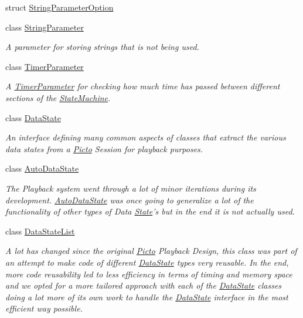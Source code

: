 \begin{DoxyCompactItemize}
struct \hyperlink{struct_picto_1_1_string_parameter_option}{String\-Parameter\-Option}
\item 
class \hyperlink{class_picto_1_1_string_parameter}{String\-Parameter}
\begin{DoxyCompactList}\small\item\em A parameter for storing strings that is not being used. \end{DoxyCompactList}\item 
class \hyperlink{class_picto_1_1_timer_parameter}{Timer\-Parameter}
\begin{DoxyCompactList}\small\item\em A \hyperlink{class_picto_1_1_timer_parameter}{Timer\-Parameter} for checking how much time has passed between different sections of the \hyperlink{class_picto_1_1_state_machine}{State\-Machine}. \end{DoxyCompactList}\item 
class \hyperlink{class_picto_1_1_data_state}{Data\-State}
\begin{DoxyCompactList}\small\item\em An interface defining many common aspects of classes that extract the various data states from a \hyperlink{namespace_picto}{Picto} Session for playback purposes. \end{DoxyCompactList}\item 
class \hyperlink{class_picto_1_1_auto_data_state}{Auto\-Data\-State}
\begin{DoxyCompactList}\small\item\em The Playback system went through a lot of minor iterations during its development. \hyperlink{class_picto_1_1_auto_data_state}{Auto\-Data\-State} was once going to generalize a lot of the functionality of other types of Data \hyperlink{class_picto_1_1_state}{State}'s but in the end it is not actually used. \end{DoxyCompactList}\item 
class \hyperlink{class_picto_1_1_data_state_list}{Data\-State\-List}
\begin{DoxyCompactList}\small\item\em A lot has changed since the original \hyperlink{namespace_picto}{Picto} Playback Design, this class was part of an attempt to make code of different \hyperlink{class_picto_1_1_data_state}{Data\-State} types very reusable. In the end, more code reusability led to less efficiency in terms of timing and memory space and we opted for a more tailored approach with each of the \hyperlink{class_picto_1_1_data_state}{Data\-State} classes doing a lot more of its own work to handle the \hyperlink{class_picto_1_1_data_state}{Data\-State} interface in the most efficient way possible. \end{DoxyCompactList}\item 

\end{DoxyCompactItemize}

